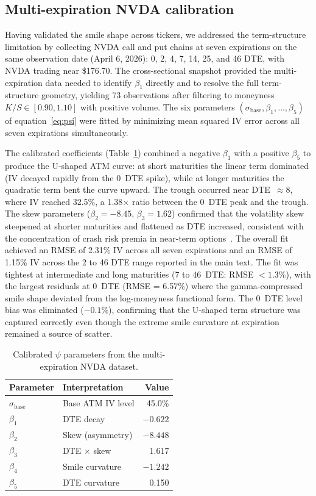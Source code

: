 \subsection{Multi-expiration NVDA calibration}

Having validated the smile shape across tickers, we addressed the term-structure limitation by collecting NVDA call and put chains at seven expirations on the same observation date (April 6, 2026): 0, 2, 4, 7, 14, 25, and 46 DTE, with NVDA trading near \$176.70. The cross-sectional snapshot provided the multi-expiration data needed to identify $\beta_1$ directly and to resolve the full term-structure geometry, yielding 73 observations after filtering to moneyness $K/S \in [0.90, 1.10]$ with positive volume. The six parameters $(\sigma_{\text{base}}, \beta_1, \ldots, \beta_5)$ of equation~\eqref{eq:psi} were fitted by minimizing mean squared IV error across all seven expirations simultaneously.

The calibrated coefficients (Table~\ref{tab:supp_term_params}) combined a negative $\beta_1$ with a positive $\beta_5$ to produce the U-shaped ATM curve: at short maturities the linear term dominated (IV decayed rapidly from the 0~DTE spike), while at longer maturities the quadratic term bent the curve upward. The trough occurred near DTE~$\approx 8$, where IV reached 32.5\%, a 1.38$\times$ ratio between the 0~DTE peak and the trough. The skew parameters ($\beta_2 = -8.45$, $\beta_3 = 1.62$) confirmed that the volatility skew steepened at shorter maturities and flattened as DTE increased, consistent with the concentration of crash risk premia in near-term options~\cite{bates2000}. The overall fit achieved an RMSE of 2.31\% IV across all seven expirations and an RMSE of 1.15\% IV across the 2 to 46 DTE range reported in the main text. The fit was tightest at intermediate and long maturities (7 to 46~DTE: RMSE $< 1.3$\%), with the largest residuals at 0~DTE (RMSE = 6.57\%) where the gamma-compressed smile shape deviated from the log-moneyness functional form. The 0~DTE level bias was eliminated ($-0.1$\%), confirming that the U-shaped term structure was captured correctly even though the extreme smile curvature at expiration remained a source of scatter.

\begin{table}[ht]
\centering
\caption{Calibrated $\psi$ parameters from the multi-expiration NVDA dataset.}\label{tab:supp_term_params}
\begin{tabular}{llr}
\toprule
Parameter & Interpretation & Value \\
\midrule
$\sigma_{\text{base}}$ & Base ATM IV level & 45.0\% \\
$\beta_1$ & DTE decay           & $-0.622$ \\
$\beta_2$ & Skew (asymmetry)    & $-8.448$ \\
$\beta_3$ & DTE $\times$ skew   & 1.617 \\
$\beta_4$ & Smile curvature     & $-1.242$ \\
$\beta_5$ & DTE curvature       & 0.150 \\
\bottomrule
\end{tabular}
\end{table}

